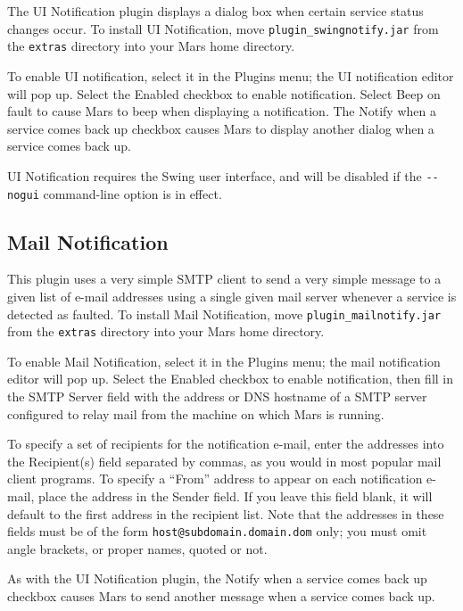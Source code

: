 \documentclass{article}
\newcommand{\filename}[1]{{\tt #1}}
\newcommand{\identifier}[1]{{\tt #1}}
\newcommand{\guiitem}[1]{{\sf #1}}
\begin{document}
The UI Notification plugin displays a dialog box when certain service
status changes occur. To install UI Notification, move
\filename{plugin\_swingnotify.jar} from the \filename{extras}
directory into your Mars home directory.

To enable UI notification, select it in the
\guiitem{Plugins} menu; the UI notification editor will pop up. Select
the \guiitem{Enabled} checkbox to enable notification. Select
\guiitem{Beep on fault} to cause Mars to beep when displaying a
notification. The \guiitem{Notify when a service comes back up}
checkbox causes Mars to display another dialog when a service comes
back up.

UI Notification requires the Swing user interface, and will be
disabled if the \identifier{\mbox{-}\mbox{-}nogui} command-line option
is in effect.

\subsection{Mail Notification}

This plugin uses a very simple SMTP client to send a very simple
message to a given list of e-mail addresses using a single given mail
server whenever a service is detected as faulted. To install Mail
Notification, move \filename{plugin\_mailnotify.jar} from the
\filename{extras} directory into your Mars home directory.

To enable Mail Notification, select it in the \guiitem{Plugins} menu;
the mail notification editor will pop up. Select the \guiitem{Enabled}
checkbox to enable notification, then fill in the \guiitem{SMTP
  Server} field with the address or DNS hostname of a SMTP server
configured to relay mail from the machine on which Mars is running.

To specify a set of recipients for the notification e-mail, enter the
addresses into the \guiitem{Recipient(s)} field separated by commas,
as you would in most popular mail client programs.  To specify a
``From'' address to appear on each notification e-mail, place the
address in the \guiitem{Sender} field. If you leave this field blank,
it will default to the first address in the recipient list. Note that
the addresses in these fields must be of the form
\identifier{host@subdomain.domain.dom} only; you must omit angle
brackets, or proper names, quoted or not.

As with the UI Notification plugin, the \guiitem{Notify when a service
  comes back up} checkbox causes Mars to send another message when a
service comes back up.
\end{document}
